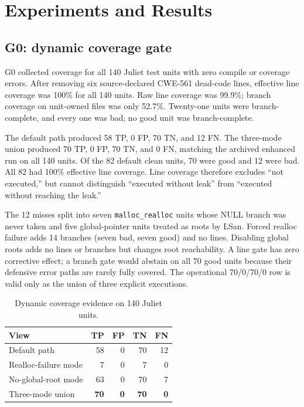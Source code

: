 \documentclass[conference]{IEEEtran}
\newcommand{\best}[1]{\textbf{#1}}
\begin{document}
\section{Experiments and Results}
\label{sec:experiments}

\subsection{G0: dynamic coverage gate}

G0 collected coverage for all 140 Juliet test units with zero compile or coverage errors. After removing six source-declared CWE-561 dead-code lines, effective line coverage was 100\% for all 140 units. Raw line coverage was 99.9\%; branch coverage on unit-owned files was only 52.7\%. Twenty-one units were branch-complete, and every one was bad; no good unit was branch-complete.

The default path produced 58 TP, 0 FP, 70 TN, and 12 FN. The three-mode union produced 70 TP, 0 FP, 70 TN, and 0 FN, matching the archived enhanced run on all 140 units. Of the 82 default clean units, 70 were good and 12 were bad. All 82 had 100\% effective line coverage. Line coverage therefore excludes ``not executed,'' but cannot distinguish ``executed without leak'' from ``executed without reaching the leak.''

The 12 misses split into seven \texttt{malloc\_realloc} units whose NULL branch was never taken and five global-pointer units treated as roots by LSan. Forced realloc failure adds 14 branches (seven bad, seven good) and no lines. Disabling global roots adds no lines or branches but changes root reachability. A line gate has zero corrective effect; a branch gate would abstain on all 70 good units because their defensive error paths are rarely fully covered. The operational 70/0/70/0 row is valid only as the union of three explicit executions.

\begin{table}[t]
\centering
\caption{Dynamic coverage evidence on 140 Juliet units.}
\label{tab:coverage}
\footnotesize
\setlength{\tabcolsep}{3pt}
\begin{tabular}{@{}lrrrr@{}}
\toprule
View & TP & FP & TN & FN \\
\midrule
Default path & 58 & 0 & 70 & 12 \\
Realloc-failure mode & 7 & 0 & 7 & 0 \\
No-global-root mode & 63 & 0 & 70 & 7 \\
Three-mode union & \best{70} & \best{0} & \best{70} & \best{0} \\
\bottomrule
\end{tabular}
\end{table}
\end{document}
